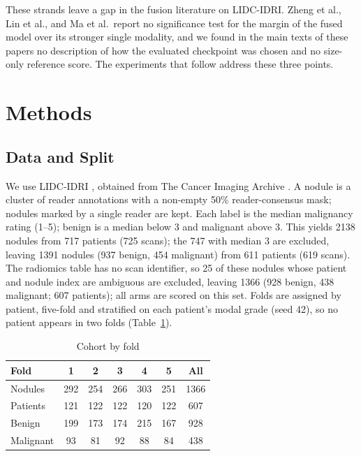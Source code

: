 \documentclass[conference]{IEEEtran}
\begin{document}
These strands leave a gap in the fusion literature on LIDC-IDRI. Zheng et al., Lin et al., and Ma et al.\ report no significance test for the margin of the fused model over its stronger single modality, and we found in the main texts of these papers no description of how the evaluated checkpoint was chosen and no size-only reference score. The experiments that follow address these three points.

\section{Methods}\label{sec:methods}

\subsection{Data and Split}\label{sec:dataset}
We use LIDC-IDRI \cite{armato_lidcidri_2011}, obtained from The Cancer Imaging Archive \cite{clark_tcia_2013}. A nodule is a cluster of reader annotations with a non-empty 50\% reader-consensus mask; nodules marked by a single reader are kept. Each label is the median malignancy rating (1--5); benign is a median below 3 and malignant above 3. This yields 2138 nodules from 717 patients (725 scans); the 747 with median 3 are excluded, leaving 1391 nodules (937 benign, 454 malignant) from 611 patients (619 scans). The radiomics table has no scan identifier, so 25 of these nodules whose patient and nodule index are ambiguous are excluded, leaving 1366 (928 benign, 438 malignant; 607 patients); all arms are scored on this set. Folds are assigned by patient, five-fold and stratified on each patient's modal grade (seed 42), so no patient appears in two folds (Table~\ref{tab:cohort}).


\begin{table}[t]
\caption{Cohort by fold}
\label{tab:cohort}
\centering
\footnotesize
\setlength{\tabcolsep}{4pt}
\begin{tabular}{@{}lcccccc@{}}
\toprule
Fold & 1 & 2 & 3 & 4 & 5 & All \\
\midrule
Nodules & 292 & 254 & 266 & 303 & 251 & 1366 \\
Patients & 121 & 122 & 122 & 120 & 122 & 607 \\
Benign & 199 & 173 & 174 & 215 & 167 & 928 \\
Malignant & 93 & 81 & 92 & 88 & 84 & 438 \\
\bottomrule
\end{tabular}
\end{table}
\end{document}
